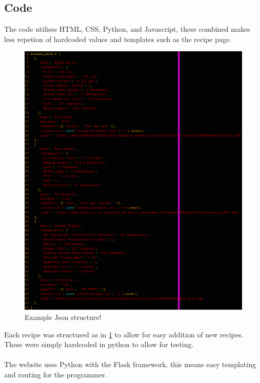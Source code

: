 \documentclass[a4paper]{scrartcl}
\begin{document}
\subsection{Code}
The code utilises HTML, CSS, Python, and Javascript, these combined makes less repetion of
hardcoded values and templates such as the recipe page.
\begin{figure}[H]
  \begin{center}
    \includegraphics[scale=0.8]{images/code_1.png}
    \caption{Example Json structure!}
    \label{fig:code_recp}
  \end{center}
\end{figure}
\noindent
Each recipe was structured as in \ref{fig:code_recp} to allow for easy addition
of new recipes. These were simply hardcoded in python to allow for testing.
\\\\
\noindent
The website uses Python with the Flask framework, this means easy templating
and routing for the programmer.
\end{document}
